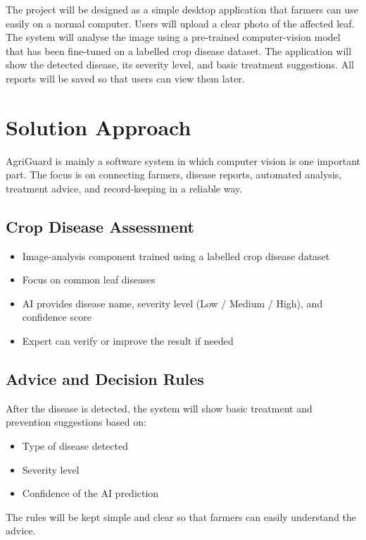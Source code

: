 \documentclass[11pt,a4paper]{article}
\begin{document}
The project will be designed as a simple desktop application that farmers can use easily on a normal computer.
Users will upload a clear photo of the affected leaf. The system will analyse the image using a pre-trained computer-vision model that has been fine-tuned on a labelled crop disease dataset. 
The application will show the detected disease, its severity level, and basic treatment suggestions. All reports will be saved so that users can view them later.


\section{Solution Approach}
AgriGuard is mainly a software system in which computer vision is one important part. The focus is on connecting farmers, disease reports, automated analysis, treatment advice, and record-keeping in a reliable way.

\subsection{Crop Disease Assessment}
\begin{itemize}[leftmargin=*]
    \item Image-analysis component trained using a labelled crop disease dataset
    \item Focus on common leaf diseases
    \item AI provides disease name, severity level (Low / Medium / High), and confidence score
    \item Expert can verify or improve the result if needed
\end{itemize}

\subsection{Advice and Decision Rules}
After the disease is detected, the system will show basic treatment and prevention suggestions based on:
\begin{itemize}[leftmargin=*]
    \item Type of disease detected
    \item Severity level
    \item Confidence of the AI prediction
\end{itemize}
The rules will be kept simple and clear so that farmers can easily understand the advice.
\end{document}
